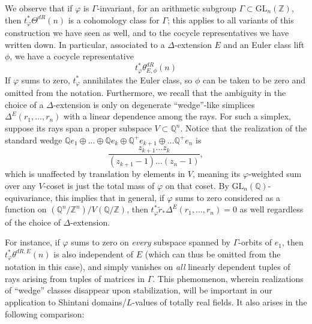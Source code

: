 \documentclass[10pt]{amsart}
\theoremstyle{definition}
\newcommand{\Z}{\mathbb{Z}}
\newcommand{\Q}{\mathbb{Q}}
\newcommand{\GL}{\mathrm{GL}}
\numberwithin{equation}{section}
\begin{document}
    We observe that if $\varphi$ is $\Gamma$-invariant, for an arithmetic subgroup $\Gamma\subset \GL_n(\Z)$, then $t_\varphi^*\Theta^{dR}(n)$ is a cohomology class for $\Gamma$; this applies to all variants of this construction we have seen as well, and to the cocycle representatives we have written down. In particular, associated to a $\Delta$-extension $E$ and an Euler class lift $\phi$, we have a cocycle representative
    \[
        t_\varphi^*\theta^{dR}_{E,\phi}(n)
    \]
    If $\varphi$ sums to zero, $t_\varphi^*$ annihilates the Euler class, so $\phi$ can be taken to be zero and omitted from the notation. Furthermore, we recall that the ambiguity in the choice of a $\Delta$-extension is only on degenerate ``wedge''-like simplices $\Delta^E(r_1,\ldots, r_n)$ with a linear dependence among the rays. For such a simplex, suppose its rays span a proper subspace $V\subset \Q^n$. Notice that the realization of the standard wedge $\Q e_1 \oplus \ldots \oplus \Q e_k \oplus \Q^+ e_{k+1}\oplus \ldots \Q^+ e_{n}$ is
    \[
        \frac{z_{k+1}\ldots z_{k}}{(z_{k+1}-1)\ldots(z_n-1)},
    \]
    which is unaffected by translation by elements in $V$, meaning its $\varphi$-weighted sum over any $V$-coset is just the total mass of $\varphi$ on that coset. By $\GL_n(\Q)$-equivariance, this implies that in general, if $\varphi$ sums to zero considered as a function on $(\Q^n/\Z^n)/V(\Q/\Z)$, then $t_\varphi^* \tilde{r}_* \Delta^E(r_1,\ldots, r_n) = 0$ as well regardless of the choice of $\Delta$-extension.

    For instance, if $\varphi$ sums to zero on \emph{every} subspace spanned by $\Gamma$-orbits of $e_1$, then $t_\varphi^*\theta^{dR,E}(n)$ is also independent of $E$ (which can thus be omitted from the notation in this case), and simply vanishes on \emph{all} linearly dependent tuples of rays arising from tuples of matrices in $\Gamma$. This phemomenon, wherein realizations of ``wedge'' classes disappear upon stabilization, will be important in our application to Shintani domains/$L$-values of totally real fields. It also arises in the following comparison:
\end{document}
